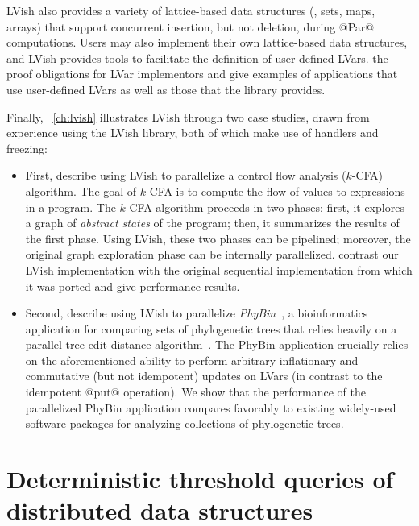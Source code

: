 LVish also provides a variety of lattice-based data structures (\eg,
sets, maps, arrays) that support concurrent insertion, but not
deletion, during @Par@ computations.  Users may also implement their own lattice-based data structures,
and LVish provides tools to facilitate the definition of user-defined
LVars.   the proof obligations for LVar
implementors and give examples of applications that use user-defined
LVars as well as those that the library provides.

Finally, ~\ref{ch:lvish}
illustrates LVish through two case studies, drawn from  experience using the LVish library, both of which
make use of handlers and freezing:
\begin{itemize}
\item First,  describe using LVish to parallelize a control flow
  analysis ($k$-CFA) algorithm.  The goal of $k$-CFA is to compute the
  flow of values to expressions in a program.  The $k$-CFA algorithm
  proceeds in two phases: first, it explores a graph of \emph{abstract
    states} of the program; then, it summarizes the results of the
  first phase.  Using LVish, these two phases can be pipelined;
  moreover, the original graph exploration phase can be internally
  parallelized.   contrast our LVish implementation with the original
  sequential implementation from which it was ported and give performance results.
\item Second,  describe using LVish to parallelize
  \emph{PhyBin}~\cite{PhyBin}, a bioinformatics application for
  comparing sets of phylogenetic trees that relies heavily on a
  parallel tree-edit distance algorithm~\cite{hashrf}.  The PhyBin
  application crucially relies on the aforementioned ability to
  perform arbitrary inflationary and commutative (but not idempotent)
  updates on LVars (in contrast to the idempotent @put@ operation).
  We show that the performance of the parallelized PhyBin application
  compares favorably to existing widely-used software packages for
  analyzing collections of phylogenetic trees.
\end{itemize}

\ifdefined\DISSERTATION
\section{Deterministic threshold queries of distributed data structures}\label{s:intro-cvrdts}

